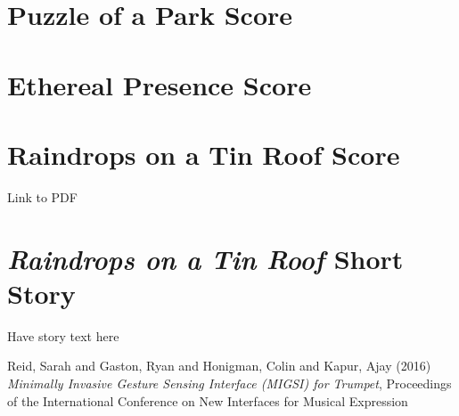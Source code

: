 \chapter{Puzzle of a Park Score}



\chapter{Ethereal Presence Score}



\chapter{Raindrops on a Tin Roof Score}
Link to PDF 
% 

\chapter{\textit{Raindrops on a Tin Roof} Short Story}
Have story text here






\backmatter


\begin{thebibliography}{99}


 Reid, Sarah and Gaston, Ryan and Honigman, Colin and Kapur, Ajay (2016) \emph{Minimally Invasive Gesture Sensing Interface (MIGSI) for Trumpet}, Proceedings of the International Conference on New Interfaces for Musical Expression



\end{thebibliography}


